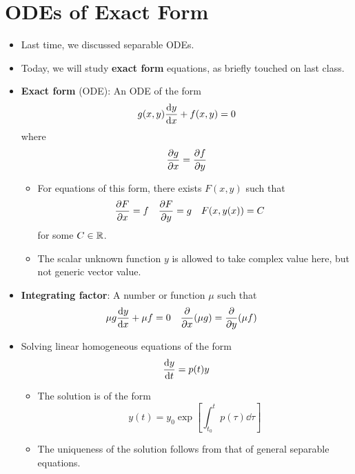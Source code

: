 \documentclass[../notes.tex]{subfiles}
\begin{document}
\section{ODEs of Exact Form}
\begin{itemize}
    \item {}Last time, we discussed separable ODEs.
    \item Today, we will study \textbf{exact form} equations, as briefly touched on last class.
    \item \textbf{Exact form} (ODE): An ODE of the form
    \begin{equation*}
        g(x,y)\dv{y}{x}+f(x,y) = 0
    \end{equation*}
    where
    \begin{equation*}
        \pdv{g}{x} = \pdv{f}{y}
    \end{equation*}
    \begin{itemize}
        \item For equations of this form, there exists $F(x,y)$ such that
        \begin{align*}
            \pdv{F}{x} &= f&
            \pdv{F}{y} &= g&
            F(x,y(x)) &= C
        \end{align*}
        for some $C\in\mathbb{R}$.
        \item The scalar unknown function $y$ is allowed to take complex value here, but not generic vector value.
    \end{itemize}
    \item \textbf{Integrating factor}: A number or function $\mu$ such that
    \begin{align*}
        \mu g\dv{y}{x}+\mu f &= 0&
        \pdv{x}(\mu g) &= \pdv{y}(\mu f)
    \end{align*}
    \item Solving linear homogeneous equations of the form
    \begin{equation*}
        \dv{y}{t} = p(t)y
    \end{equation*}
    \begin{itemize}
        \item The solution is of the form
        \begin{equation*}
            y(t) = y_0\exp[\int_{t_0}^tp(\tau)\dd\tau]
        \end{equation*}
        \item The uniqueness of the solution follows from that of general separable equations.
    \end{itemize}

\end{itemize}
\end{document}
